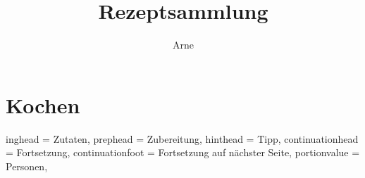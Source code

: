 \documentclass[%
a4paper,
11pt
]{article}
\title{Rezeptsammlung}
\author{Arne}
\begin{document}


\tableofcontents

\vspace{5em}


\section{Kochen}
\pagebreak


\setHeadlines
{%
    inghead = Zutaten,
    prephead = Zubereitung,
    hinthead = Tipp,
    continuationhead = Fortsetzung,
    continuationfoot = Fortsetzung auf n\"achster Seite,
    portionvalue = Personen,
}
\end{document}
